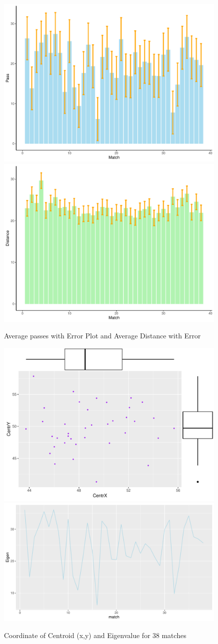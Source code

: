 \documentclass{mcmthesis}
\begin{document}
\begin{figure}[h!]
\begin{center}
\includegraphics[width=.4\textwidth]{F9_1.pdf}\includegraphics[width=.4\textwidth]{F9_2.pdf}
\caption{Average passes with Error Plot and Average Distance with Error}
\end{center}
\end{figure}
\begin{figure}[h!]
\begin{center}
\includegraphics[scale=0.4]{F10_1.pdf}\includegraphics[scale=0.4]{F10_2.pdf}
\caption{Coordinate of Centroid (x,y) and Eigenvalue for 38 matches}
\end{center}
\end{figure}
\end{document}
